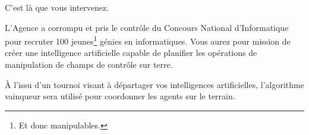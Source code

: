 C'est là que vous intervenez.

L'Agence a corrompu et pris le contrôle du Concours National d'Informatique
pour recruter 100 jeunes\footnote{Et donc manipulables.} génies en
informatiques. Vous aurez pour mission de créer une intelligence artificielle
capable de planifier les opérations de manipulation de champs de contrôle sur
terre.

À l'issu d'un tournoi visant à départager vos intelligences artificielles,
l'algorithme vainqueur sera utilisé pour coordonner les agents sur le terrain.
